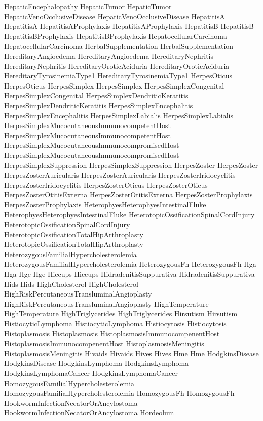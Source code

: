  HepaticEncephalopathy
 HepaticTumor
 HepaticTumor
 HepaticVenoOcclusiveDisease
 HepaticVenoOcclusiveDisease
 HepatitisA
 HepatitisA
 HepatitisAProphylaxis
 HepatitisAProphylaxis
 HepatitisB
 HepatitisB
 HepatitisBProphylaxis
 HepatitisBProphylaxis
 HepatocellularCarcinoma
 HepatocellularCarcinoma
 HerbalSupplementation
 HerbalSupplementation
 HereditaryAngioedema
 HereditaryAngioedema
 HereditaryNephritis
 HereditaryNephritis
 HereditaryOroticAciduria
 HereditaryOroticAciduria
 HereditaryTyrosinemiaType1
 HereditaryTyrosinemiaType1
 HerpesOticus
 HerpesOticus
 HerpesSimplex
 HerpesSimplex
 HerpesSimplexCongenital
 HerpesSimplexCongenital
 HerpesSimplexDendriticKeratitis
 HerpesSimplexDendriticKeratitis
 HerpesSimplexEncephalitis
 HerpesSimplexEncephalitis
 HerpesSimplexLabialis
 HerpesSimplexLabialis
 HerpesSimplexMucocutaneousImmunocompetentHost
 HerpesSimplexMucocutaneousImmunocompetentHost
 HerpesSimplexMucocutaneousImmunocompromisedHost
 HerpesSimplexMucocutaneousImmunocompromisedHost
 HerpesSimplexSuppression
 HerpesSimplexSuppression
 HerpesZoster
 HerpesZoster
 HerpesZosterAuricularis
 HerpesZosterAuricularis
 HerpesZosterIridocyclitis
 HerpesZosterIridocyclitis
 HerpesZosterOticus
 HerpesZosterOticus
 HerpesZosterOtitisExterna
 HerpesZosterOtitisExterna
 HerpesZosterProphylaxis
 HerpesZosterProphylaxis
 HeterophyesHeterophyesIntestinalFluke
 HeterophyesHeterophyesIntestinalFluke
 HeterotopicOssificationSpinalCordInjury
 HeterotopicOssificationSpinalCordInjury
 HeterotopicOssificationTotalHipArthroplasty
 HeterotopicOssificationTotalHipArthroplasty
 HeterozygousFamilialHypercholesterolemia
 HeterozygousFamilialHypercholesterolemia
 HeterozygousFh
 HeterozygousFh
 Hga
 Hga
 Hge
 Hge
 Hiccups
 Hiccups
 HidradenitisSuppurativa
 HidradenitisSuppurativa
 Hids
 Hids
 HighCholesterol
 HighCholesterol
 HighRiskPercutaneousTransluminalAngioplasty
 HighRiskPercutaneousTransluminalAngioplasty
 HighTemperature
 HighTemperature
 HighTriglycerides
 HighTriglycerides
 Hirsutism
 Hirsutism
 HistiocyticLymphoma
 HistiocyticLymphoma
 Histiocytosis
 Histiocytosis
 Histoplasmosis
 Histoplasmosis
 HistoplasmosisImmunocompenentHost
 HistoplasmosisImmunocompenentHost
 HistoplasmosisMeningitis
 HistoplasmosisMeningitis
 Hivaids
 Hivaids
 Hives
 Hives
 Hme
 Hme
 HodgkinsDisease
 HodgkinsDisease
 HodgkinsLymphoma
 HodgkinsLymphoma
 HodgkinsLymphomaCancer
 HodgkinsLymphomaCancer
 HomozygousFamilialHypercholesterolemia
 HomozygousFamilialHypercholesterolemia
 HomozygousFh
 HomozygousFh
 HookwormInfectionNecatorOrAncylostoma
 HookwormInfectionNecatorOrAncylostoma
 Hordeolum
